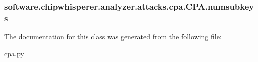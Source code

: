 \hypertarget{classsoftware_1_1chipwhisperer_1_1analyzer_1_1attacks_1_1cpa_1_1CPA_a3277c248828abebda2823699d99bae32}{}
\subsubsection[{numsubkeys}]{\setlength{\rightskip}{0pt plus 5cm}software.\+chipwhisperer.\+analyzer.\+attacks.\+cpa.\+C\+P\+A.\+numsubkeys}\label{classsoftware_1_1chipwhisperer_1_1analyzer_1_1attacks_1_1cpa_1_1CPA_a3277c248828abebda2823699d99bae32}


The documentation for this class was generated from the following file\+:\begin{DoxyCompactItemize}
\item 
\hyperlink{cpa_8py}{cpa.\+py}\end{DoxyCompactItemize}

